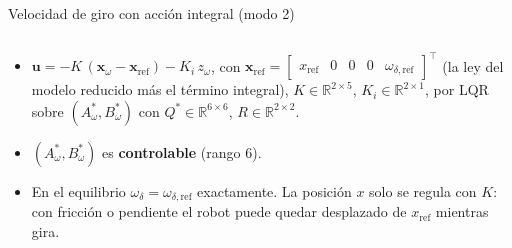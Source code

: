 \documentclass[10pt,aspectratio=169]{beamer}
\newcommand{\vx}{\mathbf{x}}
\newcommand{\vu}{\mathbf{u}}
\newcommand{\rf}{\text{ref}}
\begin{document}
\begin{frame}{Velocidad de giro con acción integral (modo 2)}
\begin{columns}[c]
\end{columns}
\begin{itemize}
  \item $\vu=-K\,(\vx_\omega-\vx_\rf)-K_i\,z_\omega$, con
  $\vx_\rf=\begin{bmatrix}x_\rf&0&0&0&\omega_{\delta,\rf}\end{bmatrix}^{\!\top}$ (la ley
  del modelo reducido más el término integral), $K\in\mathbb{R}^{2\times5}$,
  $K_i\in\mathbb{R}^{2\times1}$, por LQR sobre $(A_\omega^*,B_\omega^*)$ con
  $Q^*\in\mathbb{R}^{6\times6}$, $R\in\mathbb{R}^{2\times2}$.
  \item $(A_\omega^*,B_\omega^*)$ es \textbf{controlable} (rango 6).
  \item En el equilibrio $\omega_\delta=\omega_{\delta,\rf}$ \alert{exactamente}. La
  posición $x$ solo se regula con $K$: con fricción o pendiente el robot puede quedar
  desplazado de $x_\rf$ mientras gira.
\end{itemize}
\end{frame}
\end{document}
